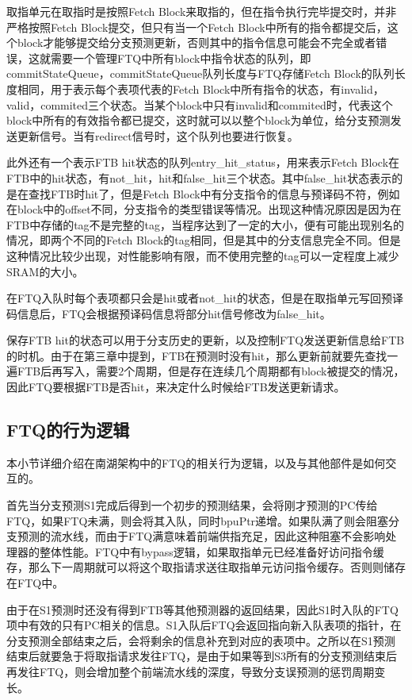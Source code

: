取指单元在取指时是按照Fetch Block来取指的，但在指令执行完毕提交时，并非严格按照Fetch Block提交，但只有当一个Fetch Block中所有的指令都提交后，这个block才能够提交给分支预测更新，否则其中的指令信息可能会不完全或者错误，这就需要一个管理FTQ中所有block中指令状态的队列，即commitStateQueue，commitStateQueue队列长度与FTQ存储Fetch Block的队列长度相同，用于表示每个表项代表的Fetch Block中所有指令的状态，有invalid，valid，commited三个状态。当某个block中只有invalid和commited时，代表这个block中所有的有效指令都已提交，这时就可以以整个block为单位，给分支预测发送更新信号。当有redirect信号时，这个队列也要进行恢复。

此外还有一个表示FTB hit状态的队列entry\_hit\_status，用来表示Fetch Block在FTB中的hit状态，有not\_hit，hit和false\_hit三个状态。其中false\_hit状态表示的是在查找FTB时hit了，但是Fetch Block中有分支指令的信息与预译码不符，例如在block中的offset不同，分支指令的类型错误等情况。出现这种情况原因是因为在FTB中存储的tag不是完整的tag，当程序达到了一定的大小，便有可能出现别名的情况，即两个不同的Fetch Block的tag相同，但是其中的分支信息完全不同。但是这种情况比较少出现，对性能影响有限，而不使用完整的tag可以一定程度上减少SRAM的大小。

在FTQ入队时每个表项都只会是hit或者not\_hit的状态，但是在取指单元写回预译码信息后，FTQ会根据预译码信息将部分hit信号修改为false\_hit。

保存FTB hit的状态可以用于分支历史的更新，以及控制FTQ发送更新信息给FTB的时机。由于在第三章中提到，FTB在预测时没有hit，那么更新前就要先查找一遍FTB后再写入，需要2个周期，但是存在连续几个周期都有block被提交的情况，因此FTQ要根据FTB是否hit，来决定什么时候给FTB发送更新请求。

\subsection{FTQ的行为逻辑}

本小节详细介绍在南湖架构中的FTQ的相关行为逻辑，以及与其他部件是如何交互的。

首先当分支预测S1完成后得到一个初步的预测结果，会将刚才预测的PC传给FTQ，如果FTQ未满，则会将其入队，同时bpuPtr递增。如果队满了则会阻塞分支预测的流水线，而由于FTQ满意味着前端供指充足，因此这种阻塞不会影响处理器的整体性能。FTQ中有bypass逻辑，如果取指单元已经准备好访问指令缓存，那么下一周期就可以将这个取指请求送往取指单元访问指令缓存。否则则储存在FTQ中。

由于在S1预测时还没有得到FTB等其他预测器的返回结果，因此S1时入队的FTQ项中有效的只有PC相关的信息。S1入队后FTQ会返回指向新入队表项的指针，在分支预测全部结束之后，会将剩余的信息补充到对应的表项中。之所以在S1预测结束后就要急于将取指请求发往FTQ，是由于如果等到S3所有的分支预测结束后再发往FTQ，则会增加整个前端流水线的深度，导致分支误预测的惩罚周期变长。

